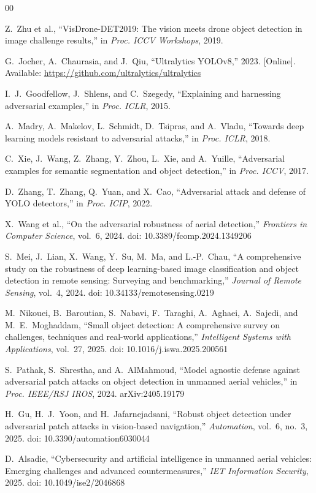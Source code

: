 \documentclass[journal]{IEEEtran}
\begin{document}

\begin{thebibliography}{00}

Z.~Zhu et al.,
``VisDrone-DET2019: The vision meets drone object detection
in image challenge results,''
in \textit{Proc. ICCV Workshops}, 2019.

G.~Jocher, A.~Chaurasia, and J.~Qiu,
``Ultralytics YOLOv8,'' 2023. [Online].
Available: \url{https://github.com/ultralytics/ultralytics}

I.~J.~Goodfellow, J.~Shlens, and C.~Szegedy,
``Explaining and harnessing adversarial examples,''
in \textit{Proc. ICLR}, 2015.

A.~Madry, A.~Makelov, L.~Schmidt, D.~Tsipras, and A.~Vladu,
``Towards deep learning models resistant to adversarial attacks,''
in \textit{Proc. ICLR}, 2018.

C.~Xie, J.~Wang, Z.~Zhang, Y.~Zhou, L.~Xie, and A.~Yuille,
``Adversarial examples for semantic segmentation and object detection,''
in \textit{Proc. ICCV}, 2017.

D.~Zhang, T.~Zhang, Q.~Yuan, and X.~Cao,
``Adversarial attack and defense of YOLO detectors,''
in \textit{Proc. ICIP}, 2022.

X.~Wang et al.,
``On the adversarial robustness of aerial detection,''
\textit{Frontiers in Computer Science}, vol.~6, 2024.
doi: 10.3389/fcomp.2024.1349206

S.~Mei, J.~Lian, X.~Wang, Y.~Su, M.~Ma, and L.-P.~Chau,
``A comprehensive study on the robustness of deep learning-based
image classification and object detection in remote sensing:
Surveying and benchmarking,''
\textit{Journal of Remote Sensing}, vol.~4, 2024.
doi: 10.34133/remotesensing.0219

M.~Nikouei, B.~Baroutian, S.~Nabavi, F.~Taraghi, A.~Aghaei,
A.~Sajedi, and M.~E.~Moghaddam,
``Small object detection: A comprehensive survey on challenges,
techniques and real-world applications,''
\textit{Intelligent Systems with Applications}, vol.~27, 2025.
doi: 10.1016/j.iswa.2025.200561

S.~Pathak, S.~Shrestha, and A.~AlMahmoud,
``Model agnostic defense against adversarial patch attacks
on object detection in unmanned aerial vehicles,''
in \textit{Proc. IEEE/RSJ IROS}, 2024.
arXiv:2405.19179

H.~Gu, H.~J.~Yoon, and H.~Jafarnejadsani,
``Robust object detection under adversarial patch attacks
in vision-based navigation,''
\textit{Automation}, vol.~6, no.~3, 2025.
doi: 10.3390/automation6030044

D.~Alsadie,
``Cybersecurity and artificial intelligence in unmanned aerial
vehicles: Emerging challenges and advanced countermeasures,''
\textit{IET Information Security}, 2025.
doi: 10.1049/ise2/2046868

\end{thebibliography}
\end{document}
